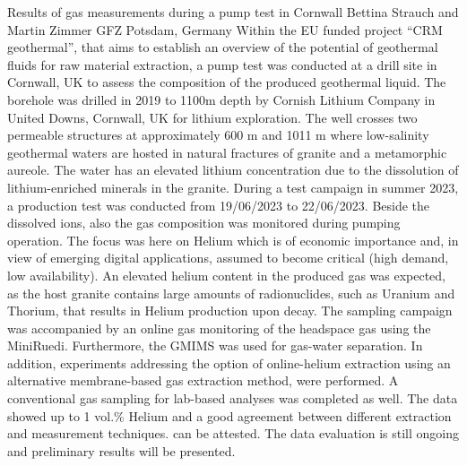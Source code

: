 \begin{conf-abstract}
{Results of gas measurements during a pump test in Cornwall}
{Bettina Strauch and Martin Zimmer}
{GFZ Potsdam, Germany}
{Within the EU funded project “CRM geothermal”, that aims to establish an overview of the potential of geothermal fluids for raw material extraction, a pump test was conducted at a drill site in Cornwall, UK to assess the composition of the produced geothermal liquid. 
The borehole was drilled in 2019 to 1100m depth by Cornish Lithium Company in United Downs, Cornwall, UK for lithium exploration. The well crosses two permeable structures at approximately 600 m and 1011 m where low-salinity geothermal waters are hosted in natural fractures of granite and a metamorphic aureole. The water has an elevated lithium concentration due to the dissolution of lithium-enriched minerals in the granite. 
During a test campaign in summer 2023, a production test was conducted from 19/06/2023 to 22/06/2023. Beside the dissolved ions, also the gas composition was monitored during pumping operation. The focus was here on Helium which is of economic importance and, in view of emerging digital applications, assumed to become critical (high demand, low availability). 
An elevated helium content in the produced gas was expected, as the host granite contains large amounts of radionuclides, such as Uranium and Thorium, that results in Helium production upon decay. 
The sampling campaign was accompanied by an online gas monitoring of the headspace gas using the MiniRuedi. Furthermore, the GMIMS was used for gas-water separation.
In addition, experiments addressing the option of online-helium extraction using an alternative membrane-based gas extraction method, were performed. 
A conventional gas sampling for lab-based analyses was completed as well. 
The data showed up to 1 vol.\% Helium and a good agreement between different extraction and measurement techniques. can be attested. The data evaluation is still ongoing and preliminary results will be presented.}
\end{conf-abstract}
